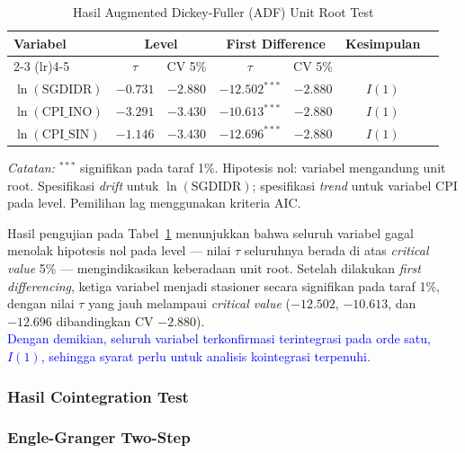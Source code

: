 \documentclass[12pt]{article}
\begin{document}
\begin{table}[H]
    \centering
    \caption{Hasil Augmented Dickey-Fuller (ADF) Unit Root Test}
    \label{tab:unitroot}
    \begin{tabular}{lcccccc}
        \toprule
        \multirow{2}{*}{Variabel} 
            & \multicolumn{2}{c}{Level} 
            & \multicolumn{2}{c}{First Difference} 
            & \multirow{2}{*}{Kesimpulan} \\
        \cmidrule(lr){2-3} \cmidrule(lr){4-5}
            & $\tau$ & CV 5\% & $\tau$ & CV 5\% & \\
        \midrule
        $\ln(\text{SGDIDR})$  & $-0.731$ & $-2.880$ & $-12.502^{***}$ & $-2.880$ & $I(1)$ \\
        $\ln(\text{CPI\_INO})$ & $-3.291$ & $-3.430$ & $-10.613^{***}$ & $-2.880$ & $I(1)$ \\
        $\ln(\text{CPI\_SIN})$ & $-1.146$ & $-3.430$ & $-12.696^{***}$ & $-2.880$ & $I(1)$ \\
        \bottomrule
    \end{tabular}
    \begin{tablenotes}
        \small
        \item \textit{Catatan:} $^{***}$ signifikan pada taraf 1\%. Hipotesis nol: 
        variabel mengandung unit root. Spesifikasi \textit{drift} untuk 
        $\ln(\text{SGDIDR})$; spesifikasi \textit{trend} untuk variabel CPI pada 
        level. Pemilihan lag menggunakan kriteria AIC.
    \end{tablenotes}
\end{table}
Hasil pengujian pada Tabel~\ref{tab:unitroot} menunjukkan bahwa seluruh variabel gagal 
menolak hipotesis nol pada level — nilai $\tau$ seluruhnya berada di atas \textit{critical 
value} 5\% — mengindikasikan keberadaan unit root. Setelah dilakukan \textit{first 
differencing}, ketiga variabel menjadi stasioner secara signifikan pada taraf 1\%, dengan 
nilai $\tau$ yang jauh melampaui \textit{critical value} ($-12.502$, $-10.613$, dan $-12.696$ 
dibandingkan CV $-2.880$). \\
\textcolor{blue}{Dengan demikian, seluruh variabel terkonfirmasi terintegrasi pada 
orde satu, $I(1)$, sehingga syarat perlu untuk analisis kointegrasi terpenuhi.}

\subsubsection{Hasil Cointegration Test}
\subsubsection*{Engle-Granger Two-Step}
\end{document}
